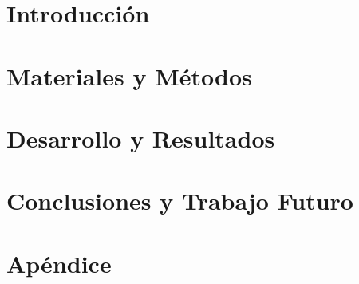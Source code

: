 \documentclass[11pt,a4paper,twoside]{tesis}
\begin{document}
\def\titulo{Licenciado}
\def\autor{Martín Ezequiel Langberg}
\def\tituloTesis{Predicción de patogenicidad en Polimorfismos de un Sólo Nucleótido usando Aprendizaje Automático}
\def\runtitulo{Predicción de patogenicidad en Polimorfismos de un Sólo Nucleótido usando Aprendizaje Automático}
\def\director{Ariel Berenstein}
\def\codirector{Pablo Turjanski}
\def\lugar{Buenos Aires, 2018}


\frontmatter
\pagestyle{empty}





\cleardoublepage
\tableofcontents

\mainmatter
\pagestyle{headings}


\chapter{Introducción}
\label{ch:introduccion}


\chapter{Materiales y Métodos}
\label{ch:materiales}


\chapter{Desarrollo y Resultados}
\label{ch:desarrollo}


\chapter{Conclusiones y Trabajo Futuro}
\label{ch:conclusiones}


\chapter{Apéndice}
\label{ch:apendice}





\backmatter




\end{document}
